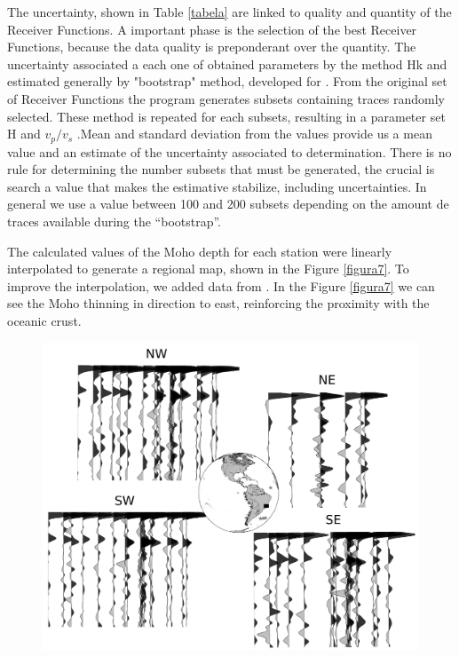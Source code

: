 The uncertainty, shown in Table \ref{tabela} are linked to quality and quantity of the Receiver Functions. A important phase is the selection of the best Receiver Functions, because the data quality is preponderant over the quantity. The uncertainty associated a each one of obtained parameters by the method Hk and estimated generally by "bootstrap" method, developed for  \citep{efron_statistical_1991}. From the original set of Receiver Functions the program generates subsets containing traces randomly selected. These method is repeated for each subsets, resulting in a parameter set H and $v_{p}/v_{s}$ .Mean and standard deviation from the values provide us a mean value and an estimate of the uncertainty associated to determination. There is no rule for determining the number subsets that must be generated, the crucial is search a value that makes the estimative stabilize,  including uncertainties. In general we use a value between 100 and 200 subsets depending on the amount de traces available during the “bootstrap”.

The calculated values of the Moho depth for each station were linearly interpolated to generate a regional map, shown in the Figure \ref{figura7}. To improve the interpolation, we added data from \citep{assumpcao_crustal_2013}. In the Figure \ref{figura7} we can see the Moho thinning in direction to east, reinforcing the proximity with the oceanic crust.

\begin{figure}[!ht]
\centering
\includegraphics[scale=0.5]{RF_azimute.png}
\caption{}
\label{RF_perfil_NW}
\end{figure}

